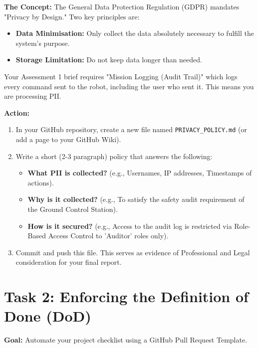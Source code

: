 \documentclass[a4paper,12pt]{article}
\begin{document}
\textbf{The Concept:} The General Data Protection Regulation (GDPR) mandates "Privacy by Design." Two key principles are:
\begin{itemize}
    \item \textbf{Data Minimisation:} Only collect the data absolutely necessary to fulfill the system's purpose.
    \item \textbf{Storage Limitation:} Do not keep data longer than needed.
\end{itemize}
Your Assessment 1 brief requires "Mission Logging (Audit Trail)" which logs every command sent to the robot, including the user who sent it. This means you are processing PII.

\vspace{0.3cm}
\textbf{Action:}
\begin{enumerate}
    \item In your GitHub repository, create a new file named \texttt{PRIVACY\_POLICY.md} (or add a page to your GitHub Wiki).
    \item Write a short (2-3 paragraph) policy that answers the following:
    \begin{itemize}
        \item \textbf{What PII is collected?} (e.g., Usernames, IP addresses, Timestamps of actions).
        \item \textbf{Why is it collected?} (e.g., To satisfy the safety audit requirement of the Ground Control Station).
        \item \textbf{How is it secured?} (e.g., Access to the audit log is restricted via Role-Based Access Control to 'Auditor' roles only).
    \end{itemize}
    \item Commit and push this file. This serves as evidence of Professional and Legal consideration for your final report.
\end{enumerate}


\section*{Task 2: Enforcing the Definition of Done (DoD)}

\textbf{Goal:} Automate your project checklist using a GitHub Pull Request Template.
\end{document}
